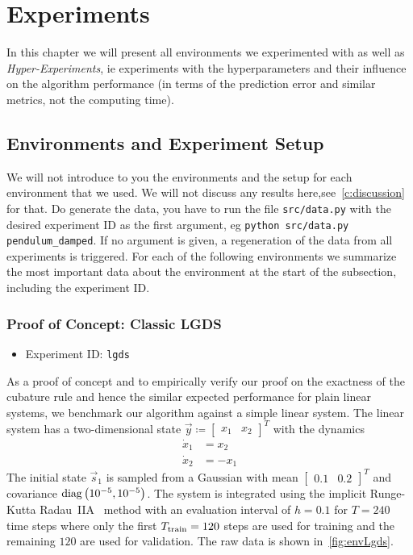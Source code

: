 \chapter{Experiments}
\label{c:experiments}



In this chapter we will present all environments we experimented with as well as \emph{Hyper-Experiments}, \ac{ie} experiments with the hyperparameters and their influence on the algorithm performance (in terms of the prediction error and similar metrics, not the computing time).

\section{Environments and Experiment Setup}
	We will not introduce to you the environments and the setup for each environment that we used. We will not discuss any results here,see~\autoref{c:discussion} for that. Do generate the data, you have to run the file \texttt{src/data.py} with the desired experiment ID as the first argument, \ac{eg} \texttt{python src/data.py pendulum\_damped}. If no argument is given, a regeneration of the data from all experiments is triggered. For each of the following environments we summarize the most important data about the environment at the start of the subsection, including the experiment ID.

	\subsection{Proof of Concept: Classic LGDS}
		\begin{itemize}
			\item Experiment ID: \texttt{lgds}
		\end{itemize}

		As a proof of concept and to empirically verify our proof on the exactness of the cubature rule and hence the similar expected performance for plain linear systems, we benchmark our algorithm against a simple linear system. The linear system has a two-dimensional state \( \vec{y} \coloneqq \begin{bmatrix} x_1 & x_2 \end{bmatrix}^T \) with the dynamics
		\begin{align*}
			\dot{x}_1 &= x_2 \\
			\dot{x}_2 &= -x_1
		\end{align*}
		The initial state \( \vec{s}_1 \) is sampled from a Gaussian with mean \( \begin{bmatrix} 0.1 & 0.2 \end{bmatrix}^T \) and covariance \( \operatorname{diag}\big(10^{-5}, 10^{-5}\big) \). The system is integrated using the implicit Runge-Kutta Radau~IIA~\cite{guglielmiImplementingRadauIIA2001} method with an evaluation interval of \( h = 0.1 \) for \( T = 240 \) time steps where only the first \( T_{\mathrm{train}} = 120 \) steps are used for training and the remaining \(120\) are used for validation. The raw data is shown in~\autoref{fig:envLgds}.

